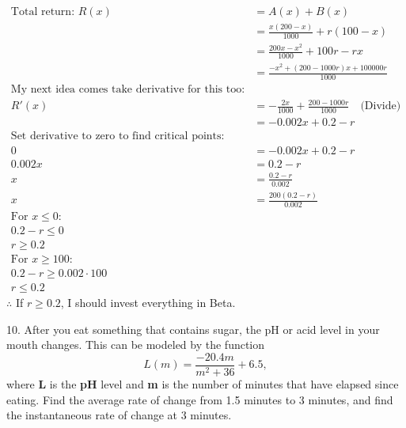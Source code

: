\documentclass{article}
\newenvironment{solution}{\color{solutioncolor}}{}
\begin{document}
\begin{enumerate}
    \begin{solution}
        \begin{align*}
            \text{Total return: } R(x) &= A(x) + B(x) \\
            &= \frac{x(200-x)}{1000} + r(100-x) \\
            &= \frac{200x - x^2}{1000} + 100r - rx \\
            &= \frac{-x^2 + (200 - 1000r)x + 100000r}{1000} \\
            \text{My next idea comes take derivative for this too:} \\
            R'(x) &= -\frac{2x}{1000} + \frac{200 - 1000r}{1000} \quad \text{(Divide)}\\
            &= -0.002x + 0.2 - r \\
            \text{Set derivative to zero to find critical points:} \\
            0 &= -0.002x + 0.2 - r \\
            0.002x &= 0.2 - r \\
            x &= \frac{0.2 - r}{0.002} \\
            x &= \frac{200(0.2 - r)}{0.002} \\
            \text{For } x \leq 0: \\
            0.2 - r \leq 0 \\
            r \geq 0.2 \\
            \text{For } x \geq 100: \\
            0.2 - r \geq 0.002 \cdot 100 \\
            r \leq 0.2
        \end{align*}
       $\therefore$ If \( r \geq 0.2 \), I should invest everything in Beta.
    \end{solution}
\end{enumerate}

10. After you eat something that contains sugar, the pH or acid level in your mouth changes. This can be modeled by the function $$ L(m) = \frac{-20.4m}{m^2+36} + 6.5, $$ where \textbf{L} is the \textbf{pH} level and \textbf{m} is the number of minutes that have elapsed since eating. Find the average rate of change from 1.5 minutes to 3 minutes, and find the instantaneous rate of change at 3 minutes.
\end{document}
